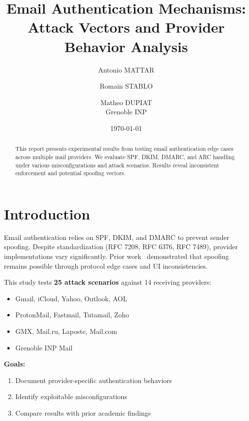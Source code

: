 \documentclass[11pt,a4paper]{article}
\title{\textbf{Email Authentication Mechanisms:\\Attack Vectors and Provider Behavior Analysis}}
\author{
    Antonio MATTAR \and Romain STABLO \and Matheo DUPIAT\\[1em]
    \small Grenoble INP
}
\date{\today}
\begin{document}
\maketitle

\begin{abstract}
This report presents experimental results from testing email authentication edge cases across multiple mail providers. We evaluate SPF, DKIM, DMARC, and ARC handling under various misconfigurations and attack scenarios. Results reveal inconsistent enforcement and potential spoofing vectors.
\end{abstract}

\tableofcontents
\newpage

\section{Introduction}

Email authentication relies on SPF, DKIM, and DMARC to prevent sender spoofing. Despite standardization (RFC 7208, RFC 6376, RFC 7489), provider implementations vary significantly. Prior work~\cite{hu2018endtoend,chen2020composition,shen2021weaklinks} demonstrated that spoofing remains possible through protocol edge cases and UI inconsistencies.

This study tests \textbf{25 attack scenarios} against 14 receiving providers:
\begin{itemize}[noitemsep]
    \item Gmail, iCloud, Yahoo, Outlook, AOL
    \item ProtonMail, Fastmail, Tutamail, Zoho
    \item GMX, Mail.ru, Laposte, Mail.com
    \item Grenoble INP Mail
\end{itemize}

\noindent\textbf{Goals:}
\begin{enumerate}[noitemsep]
    \item Document provider-specific authentication behaviors
    \item Identify exploitable misconfigurations
    \item Compare results with prior academic findings
\end{enumerate}

\end{document}
